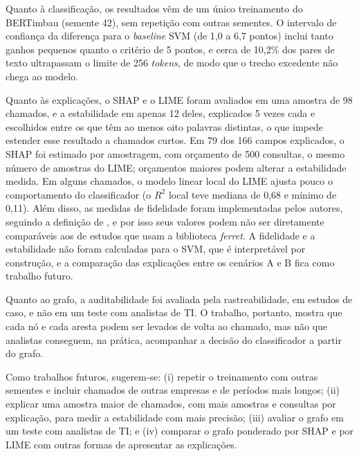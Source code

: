 \documentclass[
    12pt,                %
    openright,           %
    oneside,             %
    a4paper,             %
    english,             %
    brazil               %
]{abntex2}
\begin{document}
Quanto à classificação, os resultados vêm de um único treinamento do BERTimbau (semente 42), sem repetição com outras sementes. O intervalo de confiança da diferença para o \textit{baseline} SVM (de 1,0 a 6,7 pontos) inclui tanto ganhos pequenos quanto o critério de 5 pontos, e cerca de 10,2\% dos pares de texto ultrapassam o limite de 256 \textit{tokens}, de modo que o trecho excedente não chega ao modelo.

Quanto às explicações, o SHAP e o LIME foram avaliados em uma amostra de 98 chamados, e a estabilidade em apenas 12 deles, explicados 5 vezes cada e escolhidos entre os que têm ao menos oito palavras distintas, o que impede estender esse resultado a chamados curtos. Em 79 dos 166 campos explicados, o SHAP foi estimado por amostragem, com orçamento de 500 consultas, o mesmo número de amostras do LIME; orçamentos maiores podem alterar a estabilidade medida. Em alguns chamados, o modelo linear local do LIME ajusta pouco o comportamento do classificador (o $R^2$ local teve mediana de 0,68 e mínimo de 0,11). Além disso, as medidas de fidelidade foram implementadas pelos autores, seguindo a definição de , e por isso seus valores podem não ser diretamente comparáveis aos de estudos que usam a biblioteca \textit{ferret}.  A fidelidade e a estabilidade não foram calculadas para o SVM, que é interpretável por construção, e a comparação das explicações entre os cenários A e B fica como trabalho futuro.

Quanto ao grafo, a auditabilidade foi avaliada pela rastreabilidade, em estudos de caso, e não em um teste com analistas de TI. O trabalho, portanto, mostra que cada nó e cada aresta podem ser levados de volta ao chamado, mas não que analistas conseguem, na prática, acompanhar a decisão do classificador a partir do grafo.

Como trabalhos futuros, sugerem-se: (i) repetir o treinamento com outras sementes e incluir chamados de outras empresas e de períodos mais longos; (ii) explicar uma amostra maior de chamados, com mais amostras e consultas por explicação, para medir a estabilidade com mais precisão; (iii) avaliar o grafo em um teste com analistas de TI; e (iv) comparar o grafo ponderado por SHAP e por LIME com outras formas de apresentar as explicações.

\postextual
\end{document}
